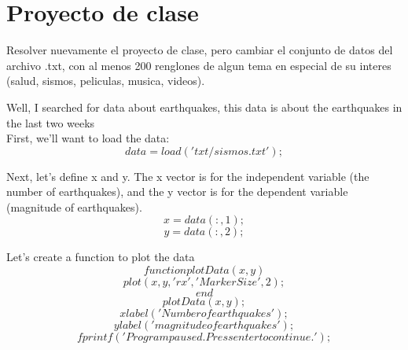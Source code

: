 \documentclass[a4paper,12pt]{article}
\begin{document}
\section{Proyecto de clase}
\justifying
\par
Resolver nuevamente el proyecto de clase, pero cambiar el conjunto de datos del archivo .txt, con al menos 200 renglones de algun tema en especial de su interes (salud, sismos, peliculas, musica, videos).
\par
Well, I searched for data about earthquakes, this data is about the earthquakes in the last two weeks\\ 
First, we'll want to load the data:
\begin{equation}
    \label{simple_equation}
	data = load('txt/sismos.txt');
\end{equation}
\par
Next, let's define x and y. The x vector is for the independent variable (the number of earthquakes), and the y vector is for the dependent variable (magnitude of earthquakes). 
\begin{equation}
    \label{simple_equation}
	x = data(:,1);
\end{equation}
\begin{equation}
    \label{simple_equation}
	y = data(:,2);
\end{equation}
\par
Let's create a function to plot the data
\begin{equation}
    \label{simple_equation}
	function plotData(x,y)
\end{equation}
\begin{equation}
    \label{simple_equation}
	plot(x,y,'rx','MarkerSize',2);
\end{equation}
\begin{equation}
    \label{simple_equation}
	end
\end{equation}
\begin{equation}
    \label{simple_equation}
	plotData(x,y);
\end{equation}
\begin{equation}
    \label{simple_equation}
	xlabel('Number of earthquakes');
\end{equation}
\begin{equation}
    \label{simple_equation}
	ylabel('magnitude of earthquakes');
\end{equation}
\begin{equation}
    \label{simple_equation}
	fprintf('Program paused. Press enter to continue.');
\end{equation}
\end{document}
